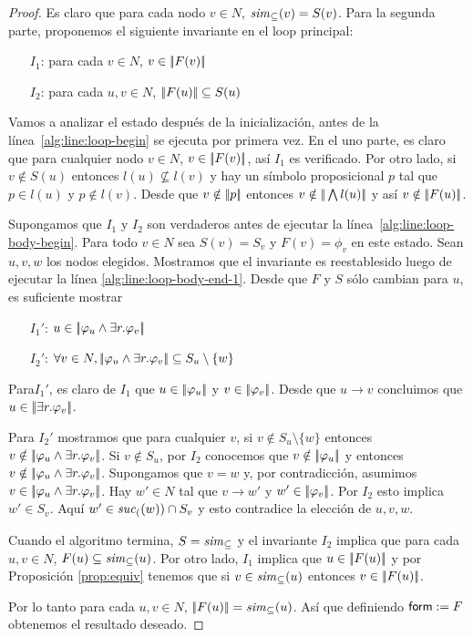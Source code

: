 \iffullversion
\begin{proof}
Es claro que para cada nodo $v\in N$,
${\it sim}_\subseteq(v)=S(v)$. Para la segunda parte, proponemos el siguiente invariante en el loop principal:
\begin{itemize}
\item[$I_1$:] para cada $v\in N$, $v \in |\!|F(v)|\!|$
\item[$I_2$:] para cada $u,v\in N$, $|\!|F(u)|\!| \subseteq S(u)$
\end{itemize}

Vamos a analizar el estado despu\'es de la inicializaci\'on, antes de la l\'inea~\ref{alg:line:loop-begin} se ejecuta por primera vez. En el uno
parte, es claro que para cualquier nodo $v\in N$, $v \in |\!|F(v)|\!|$, as\'i
$I_1$ es verificado. Por otro lado, si $v\notin S(u)$ entonces
$l(u)\not\subseteq l(v)$ y hay un s\'imbolo proposicional $p$ tal que $p \in l(u)$ y $p \notin l(v)$. Desde que $v\notin|\!|p|\!|$
entonces $v\notin|\!|\bigwedge l(u)|\!|$ y as\'i
$v\notin |\!|F(u)|\!|$.

Supongamos que $I_1$ y $I_2$ son verdaderos antes de ejecutar la 
l\'inea~\ref{alg:line:loop-body-begin}. Para todo $v\in N$ sea $S(v)=S_v$ y
$F(v)=\phi_v$ en este estado. Sean $u,v,w$ los nodos elegidos. Mostramos que el invariante es reestablesido luego de ejecutar la l\'inea
\ref{alg:line:loop-body-end-1}. Desde que $F$ y $S$ s\'olo cambian para $u$, 
es suficiente mostrar
\begin{itemize}
\item[$I_1'$:] $u \in |\!|\varphi_u\wedge\exists r. \varphi_v|\!|$
\item[$I_2'$:] $\forall v\in N, |\!|\varphi_u\wedge\exists r. \varphi_v|\!| \subseteq S_u\setminus\{w\}$
\end{itemize}
Para$I_1'$, es claro de $I_1$ que $u \in |\!|\varphi_u|\!|$ y $v \in |\!|\varphi_v|\!|$. Desde que $u\to v$ concluimos que $u \in |\!|\exists r.
\varphi_v|\!|$.

Para $I_2'$ mostramos que para cualquier $v$, si $v\notin S_u\setminus\{w\}$
entonces $v\notin |\!|\varphi_u\wedge\exists r. \varphi_v|\!|$. Si $v\notin S_u$,
por $I_2$ conocemos que $v\notin |\!|\varphi_u|\!|$ y entonces $v\notin
|\!|\varphi_u\wedge\exists r. \varphi_v|\!|$. Supongamos que $v=w$ y, por
contradicci\'on, asumimos $v \in |\!|\varphi_u\wedge\exists r. \varphi_v|\!|$.
Hay $w'\in N$ tal que $v\to w'$ y $w' \in
|\!|\varphi_v|\!|$. Por $I_2$ esto implica $w'\in S_v$. Aqu\'i $w'\in{\it suc}_{(}(w))\cap S_v$ y esto contradice la elecci\'on de $u,v,w$.

Cuando el algoritmo termina, $S={\it sim}_\subseteq$ y
el invariante $I_2$ implica que para cada $u,v\in N$,
$F(u) \subseteq {\it sim}_\subseteq(u)$. Por otro lado, $I_1$
implica que $u \in |\!|F(u)|\!|$ y por Proposici\'on \ref{prop:equiv} tenemos que si
 $v\in {\it sim}_\subseteq(u)$ entonces $v \in |\!|F(u)|\!|$.

Por lo tanto para cada $u,v\in N$, $|\!|F(u)|\!| = {\it sim}_\subseteq(u)$. 
As\'i que definiendo $\mathsf{form}:=F$ obtenemos el resultado deseado.
\end{proof}
\else
\fi

